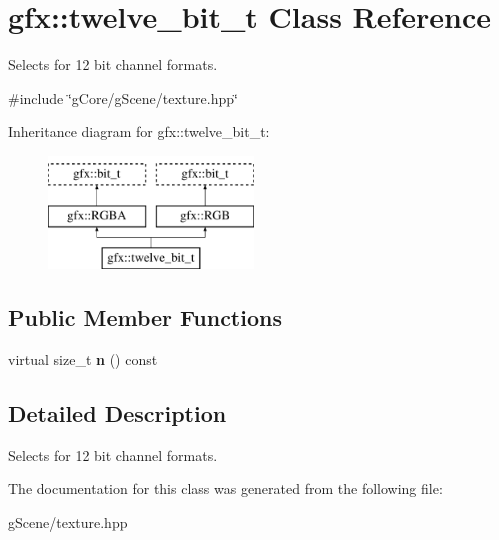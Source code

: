\hypertarget{classgfx_1_1twelve__bit__t}{\section{gfx\-:\-:twelve\-\_\-bit\-\_\-t Class Reference}
\label{classgfx_1_1twelve__bit__t}
}


Selects for 12 bit channel formats.  




{\ttfamily \#include \char`\"{}g\-Core/g\-Scene/texture.\-hpp\char`\"{}}

Inheritance diagram for gfx\-:\-:twelve\-\_\-bit\-\_\-t\-:\begin{figure}[H]
\begin{center}
\leavevmode
\includegraphics[height=3.000000cm]{classgfx_1_1twelve__bit__t}
\end{center}
\end{figure}
\subsection*{Public Member Functions}
\begin{DoxyCompactItemize}
\item 
\hypertarget{classgfx_1_1twelve__bit__t_a7425bbff5ff74543d243a89330d6a9b5}{virtual size\-\_\-t {\bfseries n} () const }\label{classgfx_1_1twelve__bit__t_a7425bbff5ff74543d243a89330d6a9b5}

\end{DoxyCompactItemize}


\subsection{Detailed Description}
Selects for 12 bit channel formats. 

The documentation for this class was generated from the following file\-:\begin{DoxyCompactItemize}
\item 
g\-Scene/texture.\-hpp\end{DoxyCompactItemize}

